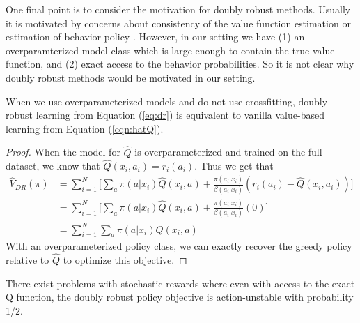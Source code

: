 One final point is to consider the motivation for doubly robust methods. Usually it is motivated by concerns about consistency of the value function estimation or estimation of behavior policy \cite{dudik2011doubly}. However, in our setting we have (1) an overparamterized model class which is large enough to contain the true value function, and (2) exact access to the behavior probabilities. So it is not clear why doubly robust methods would be motivated in our setting.

\begin{lemma}\label{lem:dr_equiv}
When we use overparameterized models and do not use crossfitting, doubly robust learning from Equation (\ref{eq:dr}) is equivalent to vanilla value-based learning from Equation (\ref{eqn:hatQ}).
\end{lemma}

\begin{proof}
When the model for $ \hat Q$ is overparameterized and trained on the full dataset, we know that $ \hat Q(x_i, a_i) = r_i(a_i)$. Thus we get that
\begin{align}
    \widehat V_{DR} (\pi) &= \sum_{i=1}^N \bigg[ \sum_a \pi(a|x_i) \hat Q(x_i, a) + \frac{\pi(a_i|x_i)}{\beta(a_i|x_i)} (r_i(a_i) - \hat Q(x_i, a_i)) \bigg]\\
    &= \sum_{i=1}^N \bigg[ \sum_a \pi(a|x_i) \hat Q(x_i, a) + \frac{\pi(a_i|x_i)}{\beta(a_i|x_i)} (0) \bigg]\\
    &= \sum_{i=1}^N \sum_a \pi(a|x_i) \hat Q(x_i, a)
\end{align}
With an overparameterized policy class, we can exactly recover the greedy policy relative to $ \hat Q$ to optimize this objective.
\end{proof}


\begin{lemma}[Instability of DR]\label{lem:dr_unstable}
There exist problems with stochastic rewards where even with access to the exact Q function, the doubly robust policy objective is action-unstable with probability 1/2.
\end{lemma}

